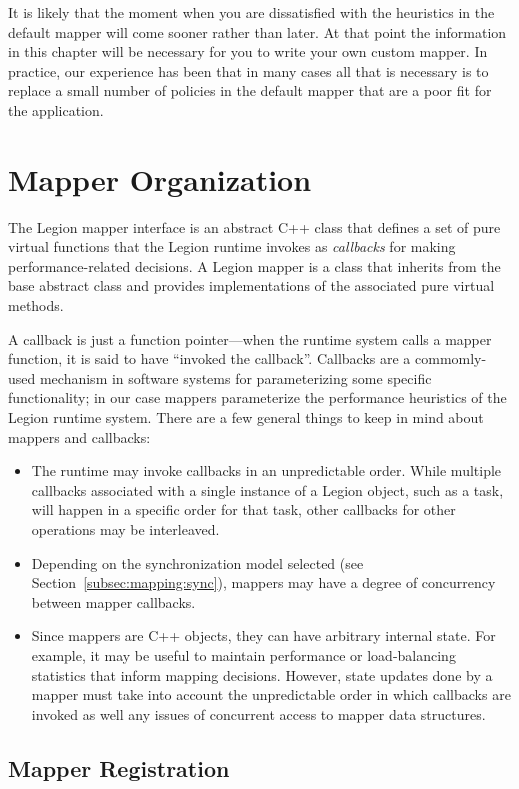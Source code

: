 It is likely that the moment when you are dissatisfied with the 
heuristics in the default mapper will come sooner rather than later.
At that point the information in this chapter will be necessary for you
to write your own custom mapper.  In practice, our experience has been that in
many cases all that is necessary is to replace a small number of policies in the
default mapper that are a poor fit for the application.

\section{Mapper Organization}
\label{sec:mapping:org}

The Legion mapper interface is an abstract C++ class that defines a set of 
pure virtual functions that the Legion runtime invokes as {\em callbacks}
for making performance-related decisions. A Legion mapper is 
a class that inherits from the base abstract class and provides 
implementations of the associated pure virtual methods.

A callback is just a function pointer---when the runtime system calls a mapper
function, it is said to have ``invoked the callback''.  Callbacks are a commomly-used
mechanism in software systems for parameterizing some specific functionality; in our case
mappers parameterize the performance heuristics of the Legion runtime system.
There are a few general things to keep in mind about mappers and callbacks:
\begin{itemize}
\item The runtime may invoke callbacks in an unpredictable order.  While multiple callbacks associated with a
  single instance of a Legion object, such as a task, will happen in a specific order for that task,
  other callbacks for other operations may be interleaved.
\item Depending on the synchronization model selected (see Section~\ref{subsec:mapping:sync}), mappers
  may have a degree of concurrency between mapper callbacks.
\item Since mappers are C++ objects, they can have arbitrary internal state.  For example, it may be useful
  to maintain performance or load-balancing statistics that inform mapping decisions.
  However, state updates done by a mapper must take into account the unpredictable order in
  which callbacks are invoked as well any issues of concurrent access to mapper data structures.
\end{itemize}

\subsection{Mapper Registration}
\label{subsec:mapping:registration}

